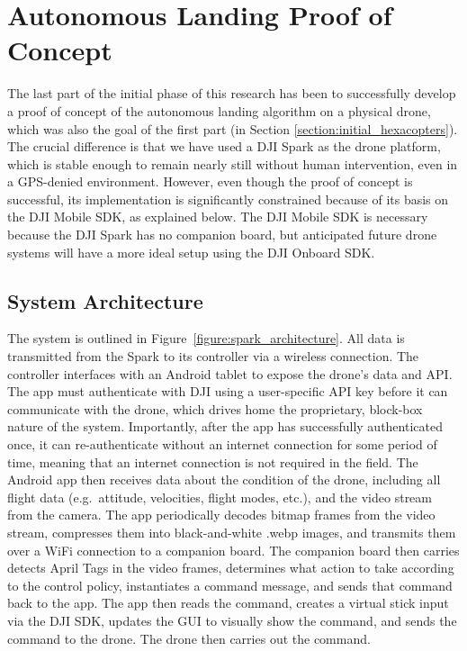 \section{Autonomous Landing Proof of Concept}
\label{section:proof_of_concept}

The last part of the initial phase of this research has been to successfully develop a proof of concept
of the autonomous landing algorithm on a physical drone, which was also the goal of the first part (in Section \ref{section:initial_hexacopters}).
The crucial difference is that we have used a DJI Spark as the drone platform,
which is stable enough to remain nearly still without human intervention,
even in a GPS-denied environment.
However, even though the proof of concept is successful,
its implementation is significantly constrained because of its basis on the DJI Mobile SDK,
as explained below.
The DJI Mobile SDK is necessary because the DJI Spark has no companion board,
but anticipated future drone systems will have a more ideal setup using the DJI Onboard SDK.

\subsection{System Architecture}

The system is outlined in Figure~\ref{figure:spark_architecture}.
All data is transmitted from the Spark to its controller via a wireless connection.
The controller interfaces with an Android tablet to expose the drone's data and API.
The app must authenticate with DJI using a user-specific API key
before it can communicate with the drone,
which drives home the proprietary, block-box nature of the system.
Importantly, after the app has successfully authenticated once, it can re-authenticate without
an internet connection for some period of time,
meaning that an internet connection is not required in the field.
The Android app then receives data about the condition of the drone,
including all flight data (e.g.~attitude, velocities, flight modes, etc.),
and the video stream from the camera.
The app periodically decodes bitmap frames from the video stream,
compresses them into black-and-white .webp images,
and transmits them over a WiFi connection to a companion board.
The companion board then carries detects April Tags in the video frames,
determines what action to take according to the control policy,
instantiates a command message,
and sends that command back to the app.
The app then reads the command,
creates a virtual stick input via the DJI SDK,
updates the GUI to visually show the command,
and sends the command to the drone.
The drone then carries out the command.

